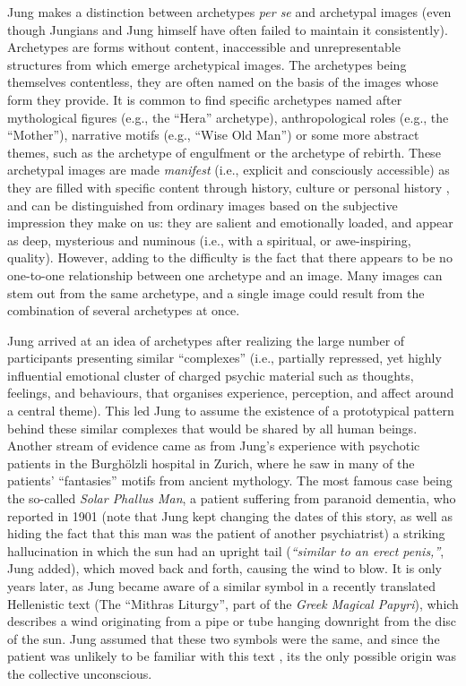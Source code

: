 \documentclass[
]{book}
\begin{document}
Jung makes a distinction between archetypes \emph{per se} and archetypal images (even though Jungians and Jung himself have often failed to maintain it consistently). Archetypes are forms without content, inaccessible and unrepresentable structures from which emerge archetypical images. The archetypes being themselves contentless, they are often named on the basis of the images whose form they provide. It is common to find specific archetypes named after mythological figures (e.g., the ``Hera'' archetype), anthropological roles (e.g., the ``Mother''), narrative motifs (e.g., ``Wise Old Man'') or some more abstract themes, such as the archetype of engulfment or the archetype of rebirth. These archetypal images are made \emph{manifest} (i.e., explicit and consciously accessible) as they are filled with specific content through history, culture or personal history \citep{papadopoulos2012}, and can be distinguished from ordinary images based on the subjective impression they make on us: they are salient and emotionally loaded, and appear as deep, mysterious and numinous (i.e., with a spiritual, or awe-inspiring, quality). However, adding to the difficulty is the fact that there appears to be no one-to-one relationship between one archetype and an image. Many images can stem out from the same archetype, and a single image could result from the combination of several archetypes at once.

Jung arrived at an idea of archetypes after realizing the large number of participants presenting similar ``complexes'' (i.e., partially repressed, yet highly influential emotional cluster of charged psychic material such as thoughts, feelings, and behaviours, that organises experience, perception, and affect around a central theme). This led Jung to assume the existence of a prototypical pattern behind these similar complexes that would be shared by all human beings. Another stream of evidence came as from Jung's experience with psychotic patients in the Burghölzli hospital in Zurich, where he saw in many of the patients' ``fantasies'' motifs from ancient mythology. The most famous case being the so-called \emph{Solar Phallus Man}, a patient suffering from paranoid dementia, who reported in 1901 (note that Jung kept changing the dates of this story, as well as hiding the fact that this man was the patient of another psychiatrist) a striking hallucination in which the sun had an upright tail (\emph{``similar to an erect penis,''}, Jung added), which moved back and forth, causing the wind to blow. It is only years later, as Jung became aware of a similar symbol in a recently translated Hellenistic text (The ``Mithras Liturgy'', part of the \emph{Greek Magical Papyri}), which describes a wind originating from a pipe or tube hanging downright from the disc of the sun. Jung assumed that these two symbols were the same, and since the patient was unlikely to be familiar with this text \citep[or so claimed Jung; see][ for a detailed description of Jung's falsifications and lies]{noll1997jung}, its the only possible origin was the collective unconscious.
\end{document}
